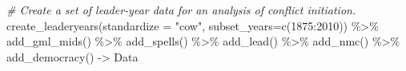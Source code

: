 \documentclass[
  11pt,
]{article}
\newenvironment{Shaded}{\begin{snugshade}}{\end{snugshade}}
\newcommand{\AttributeTok}[1]{\textcolor[rgb]{0.77,0.63,0.00}{#1}}
\newcommand{\CommentTok}[1]{\textcolor[rgb]{0.56,0.35,0.01}{\textit{#1}}}
\newcommand{\DecValTok}[1]{\textcolor[rgb]{0.00,0.00,0.81}{#1}}
\newcommand{\FunctionTok}[1]{\textcolor[rgb]{0.00,0.00,0.00}{#1}}
\newcommand{\NormalTok}[1]{#1}
\newcommand{\OtherTok}[1]{\textcolor[rgb]{0.56,0.35,0.01}{#1}}
\newcommand{\SpecialCharTok}[1]{\textcolor[rgb]{0.00,0.00,0.00}{#1}}
\newcommand{\StringTok}[1]{\textcolor[rgb]{0.31,0.60,0.02}{#1}}
\begin{document}
\begin{Shaded}
\begin{Highlighting}[]
\CommentTok{\# Create a set of leader{-}year data for an analysis of conflict initiation.}
\FunctionTok{create\_leaderyears}\NormalTok{(}\AttributeTok{standardize =} \StringTok{"cow"}\NormalTok{, }\AttributeTok{subset\_years=}\FunctionTok{c}\NormalTok{(}\DecValTok{1875}\SpecialCharTok{:}\DecValTok{2010}\NormalTok{)) }\SpecialCharTok{\%\textgreater{}\%}
  \FunctionTok{add\_gml\_mids}\NormalTok{() }\SpecialCharTok{\%\textgreater{}\%}
  \FunctionTok{add\_spells}\NormalTok{() }\SpecialCharTok{\%\textgreater{}\%}
  \FunctionTok{add\_lead}\NormalTok{() }\SpecialCharTok{\%\textgreater{}\%}
  \FunctionTok{add\_nmc}\NormalTok{() }\SpecialCharTok{\%\textgreater{}\%}
  \FunctionTok{add\_democracy}\NormalTok{() }\OtherTok{{-}\textgreater{}}\NormalTok{ Data}
\end{Highlighting}
\end{Shaded}
\end{document}
